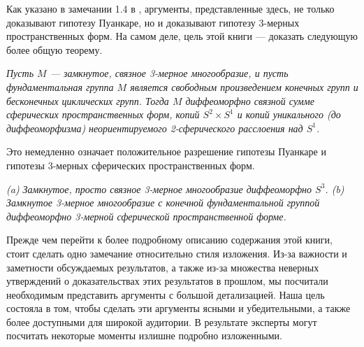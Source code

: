 Как указано в замечании 1.4 в \cite{c54}, аргументы, представленные здесь, не только 
доказывают гипотезу Пуанкаре, но и доказывают гипотезу 3-мерных пространственных 
форм. На самом деле, цель этой книги — доказать следующую более общую теорему.\vspace{0.5em}

\begin{theorem} \textit{Пусть $M$ — замкнутое, связное 3-мерное многообразие, 
и пусть фундаментальная группа $M$ является свободным произведением конечных 
групп и бесконечных циклических групп. Тогда $M$ диффеоморфно связной сумме 
сферических пространственных форм, копий $S^{2}\times S^{1}$ и копий 
уникального (до диффеоморфизма) неориентируемого 2-сферического расслоения над 
$S^{1}$.}
\end{theorem}

Это немедленно означает положительное разрешение гипотезы Пуанкаре и гипотезы 
3-мерных сферических пространственных форм.

\begin{corollary} \textit{
(a) Замкнутое, просто связное 3-мерное многообразие диффеоморфно $S^{3}$.
(b) Замкнутое 3-мерное многообразие с конечной фундаментальной группой диффеоморфно 
3-мерной сферической пространственной форме.}
\end{corollary}

Прежде чем перейти к более подробному описанию содержания этой книги, стоит 
сделать одно замечание относительно стиля изложения. Из-за важности и 
заметности обсуждаемых результатов, а также из-за множества неверных утверждений 
о доказательствах этих результатов в прошлом, мы посчитали необходимым 
представить аргументы с большой детализацией. Наша цель состояла в том, чтобы 
сделать эти аргументы ясными и убедительными, а также более доступными для 
широкой аудитории. В результате эксперты могут посчитать некоторые моменты 
излишне подробно изложенными.











